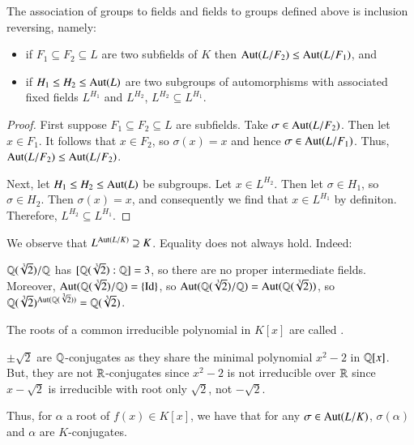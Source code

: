\begin{proposition}
    The association of groups to fields and fields to groups defined above is inclusion reversing, namely: \begin{itemize}
        \item if $F_1\subseteq F_2\subseteq L$ are two subfields of $K$ then $\operatorname{Aut}(L/F_2) \leq \operatorname{Aut}(L/F_1)$, and
        \item if $H_1 \leq H_2 \leq \operatorname{Aut}(L)$ are two subgroups of automorphisms with associated fixed fields $L^{H_1}$ and $L^{H_2}$, $L^{H_2} \subseteq L^{H_1}$.
    \end{itemize}
\end{proposition}
\begin{proof}
    First suppose $F_1 \subseteq F_2 \subseteq L$ are subfields. Take $\sigma \in \operatorname{Aut}(L/F_2)$. Then let $x \in F_1$. It follows that $x \in F_2$, so $\sigma(x) = x$ and hence $\sigma \in \operatorname{Aut}(L/F_1)$. Thus, $\operatorname{Aut}(L/F_2) \leq \operatorname{Aut}(L/F_2)$.

    Next, let $H_1 \leq H_2 \leq \operatorname{Aut}(L)$ be subgroups. Let $x \in L^{H_2}$. Then let $\sigma \in H_1$, so $\sigma \in H_2$. Then $\sigma(x) = x$, and consequently we find that $x \in L^{H_1}$ by definiton. Therefore, $L^{H_2} \subseteq L^{H_1}$.
\end{proof}

We observe that $L^{\operatorname{Aut}(L/K)} \supseteq K$. Equality does not always hold. Indeed:

\begin{example}
    $\mathbb Q(\sqrt[3]{2})/\mathbb Q$ has $[\mathbb Q(\sqrt[3]{2}):\mathbb Q] = 3$, so there are no proper intermediate fields. Moreover, $\operatorname{Aut}(\mathbb Q(\sqrt[3]{2})/\mathbb Q) = \{\operatorname{Id}\}$, so $\operatorname{Aut}(\mathbb Q(\sqrt[3]{2})/\mathbb Q) = \operatorname{Aut}(\mathbb Q(\sqrt[3]{2}))$, so $\mathbb Q(\sqrt[3]{2})^{\operatorname{Aut}(\mathbb Q(\sqrt[3]{2}))} = \mathbb Q(\sqrt[3]{2})$.
\end{example}

\begin{definition}
    The roots of a common irreducible polynomial in $K[x]$ are called .
\end{definition}

\begin{example}
    $\pm\sqrt{2}$ are $\mathbb Q$-conjugates as they share the minimal polynomial $x^2 - 2$ in $\mathbb Q[x]$. But, they are not $\mathbb R$-conjugates since $x^2-2$ is not irreducible over $\mathbb R$ since $x - \sqrt{2}$ is irreducible with root only $\sqrt{2}$, not $-\sqrt{2}$.
\end{example}

Thus, for $\alpha$ a root of $f(x) \in K[x]$, we have that for any $\sigma \in \operatorname{Aut}(L/K)$, $\sigma(\alpha)$ and $\alpha$ are $K$-conjugates.

